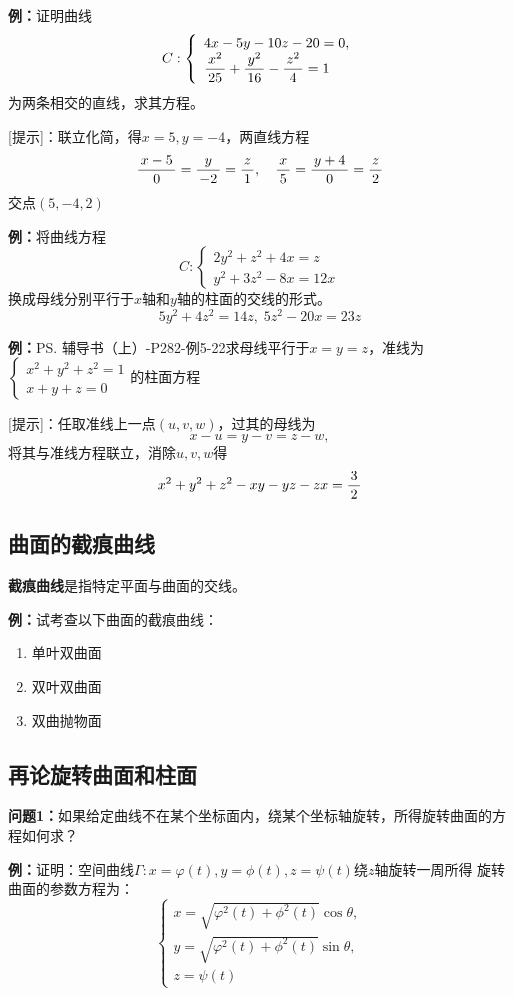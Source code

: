 {\bf 例：}证明曲线$$C:\left\{\begin{array}{l}
	4x-5y-10z-20=0,\\ \displaystyle\frac{\,{x^2}\,}{\,{25}\,}+\displaystyle\frac{\,{y^2}\,}{\,{16}\,}-\displaystyle\frac{\,{z^2}\,}{\,{4}\,}=1
\end{array}\right.$$
为两条相交的直线，求其方程。

[提示]：联立化简，得$x=5,y=-4$，两直线方程
$$\displaystyle\frac{\,{x-5}\,}{\,{0}\,}=\displaystyle\frac{\,{y}\,}{\,{-2}\,}=\displaystyle\frac{\,{z}\,}{\,{1}\,},\quad \displaystyle\frac{\,{x}\,}{\,{5}\,}=\displaystyle\frac{\,{y+4}\,}{\,{0}\,}=\displaystyle\frac{\,{z}\,}{\,{2}\,}$$
交点$(5,-4,2)$

{\bf 例：}将曲线方程$$C:\left\{\begin{array}{l}
	2y^2+z^2+4x=z\\ y^2+3z^2-8x=12x
\end{array}\right.$$
换成母线分别平行于$x$轴和$y$轴的柱面的交线的形式。
$$5y^2+4z^2=14z,\;5z^2-20x=23z$$

{\bf 例：}\ps{辅导书（上）-P282-例5-22}求母线平行于$x=y=z$，准线为
$\left\{\begin{array}{l}
	x^2+y^2+z^2=1\\ x+y+z=0
\end{array}\right.$的柱面方程

[提示]：任取准线上一点$(u,v,w)$，过其的母线为
$$x-u=y-v=z-w,$$
将其与准线方程联立，消除$u,v,w$得
$$x^2+y^2+z^2-xy-yz-zx=\displaystyle\frac{\,{3}\,}{\,{2}\,}$$

\subsection{曲面的截痕曲线}

{\bf 截痕曲线}是指特定平面与曲面的交线。

{\bf 例：}试考查以下曲面的截痕曲线：
\begin{enumerate}[(1)]
  \setlength{\itemindent}{1cm}
  \item 单叶双曲面
  \item 双叶双曲面
  \item 双曲抛物面
\end{enumerate}

\subsection{再论旋转曲面和柱面}

{\bf 问题1：}如果给定曲线不在某个坐标面内，绕某个坐标轴旋转，所得旋转曲面的方程如何求？

{\bf 例：}证明：空间曲线$\Gamma:x=\varphi(t),y=\phi(t),z=\psi(t)$绕$z$轴旋转一周所得
旋转曲面的参数方程为：
$$\left\{\begin{array}{l}
	x=\sqrt{\varphi^2(t)+\phi^2(t)}\cos\theta,\\
	y=\sqrt{\varphi^2(t)+\phi^2(t)}\sin\theta,\\
	z=\psi(t)
\end{array}\right.$$

